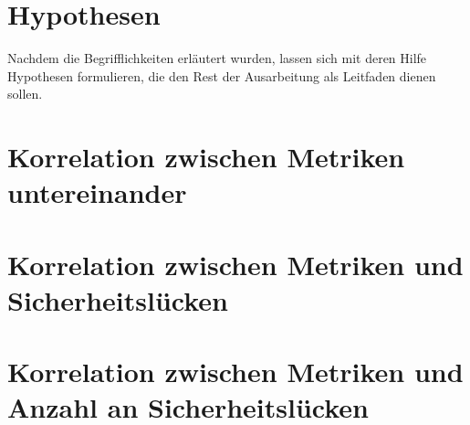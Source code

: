 \section{Hypothesen}
\label{sec:hypothesen}
Nachdem die Begrifflichkeiten erläutert wurden, lassen sich mit deren Hilfe Hypothesen formulieren, die den Rest der Ausarbeitung als Leitfaden dienen sollen.

\section{Korrelation zwischen Metriken untereinander}

\section{Korrelation zwischen Metriken und Sicherheitslücken}

\section{Korrelation zwischen Metriken und Anzahl an Sicherheitslücken}
